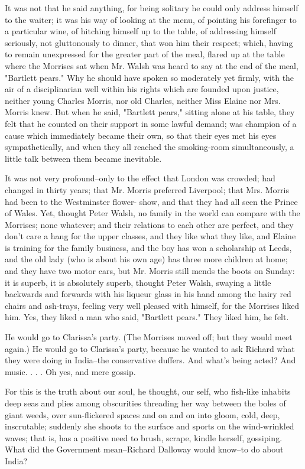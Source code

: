 \documentclass[lang=cn,10pt]{elegantbook}
\begin{document}
It was not that he said anything, for being solitary he could only
address himself to the waiter; it was his way of looking at the
menu, of pointing his forefinger to a particular wine, of hitching
himself up to the table, of addressing himself seriously, not
gluttonously to dinner, that won him their respect; which, having
to remain unexpressed for the greater part of the meal, flared up
at the table where the Morrises sat when Mr. Walsh was heard to say
at the end of the meal, "Bartlett pears."  Why he should have
spoken so moderately yet firmly, with the air of a disciplinarian
well within his rights which are founded upon justice, neither
young Charles Morris, nor old Charles, neither Miss Elaine nor Mrs.
Morris knew.  But when he said, "Bartlett pears," sitting alone at
his table, they felt that he counted on their support in some
lawful demand; was champion of a cause which immediately became
their own, so that their eyes met his eyes sympathetically, and
when they all reached the smoking-room simultaneously, a little
talk between them became inevitable.

It was not very profound--only to the effect that London was
crowded; had changed in thirty years; that Mr. Morris preferred
Liverpool; that Mrs. Morris had been to the Westminster flower-
show, and that they had all seen the Prince of Wales.  Yet, thought
Peter Walsh, no family in the world can compare with the Morrises;
none whatever; and their relations to each other are perfect, and
they don't care a hang for the upper classes, and they like what
they like, and Elaine is training for the family business, and the
boy has won a scholarship at Leeds, and the old lady (who is about
his own age) has three more children at home; and they have two
motor cars, but Mr. Morris still mends the boots on Sunday: it is
superb, it is absolutely superb, thought Peter Walsh, swaying a
little backwards and forwards with his liqueur glass in his hand
among the hairy red chairs and ash-trays, feeling very well pleased
with himself, for the Morrises liked him.  Yes, they liked a man
who said, "Bartlett pears."  They liked him, he felt.

He would go to Clarissa's party.  (The Morrises moved off; but they
would meet again.)  He would go to Clarissa's party, because he
wanted to ask Richard what they were doing in India--the
conservative duffers.  And what's being acted?  And music. . . .
Oh yes, and mere gossip.

For this is the truth about our soul, he thought, our self, who
fish-like inhabits deep seas and plies among obscurities threading
her way between the boles of giant weeds, over sun-flickered spaces
and on and on into gloom, cold, deep, inscrutable; suddenly she
shoots to the surface and sports on the wind-wrinkled waves; that
is, has a positive need to brush, scrape, kindle herself,
gossiping.  What did the Government mean--Richard Dalloway would
know--to do about India?
\end{document}
